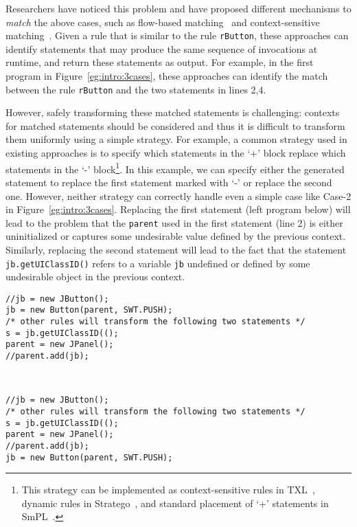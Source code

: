 \documentclass[letterpaper, USenglish]{lipics-v2016}
\newenvironment{smpage}[1]
{\begin{lrbox}{\fmbox}\begin{minipage}{#1}}
{\end{minipage}\end{lrbox}\usebox{\fmbox}}
\newcommand{\code}[1]{\texttt{\footnotesize #1}}
\theoremstyle{plain}
\begin{document}
Researchers have noticed this
problem and have proposed different
mechanisms to \emph{match} the above cases, such as flow-based
matching~\cite{DBLP:conf/popl/BrunelDHLM09} and context-sensitive matching~\cite{Cordy:2006:TST:1149670.1149672}.
Given a rule that is similar to the rule \code{rButton}, these approaches can identify
statements that may produce the same sequence of invocations at
runtime, and return these statements as output. For example, in the
first program in Figure~\ref{eg:intro:3cases}, these approaches can identify the match between the rule \code{rButton} and the two statements in lines 2,4.

However, safely transforming these matched statements is challenging: contexts for matched statements should be considered and thus it is difficult to transform them uniformly using a simple strategy.
For example,
  a common strategy used in existing approaches is to specify which
statements in the `+' block replace which statements in the `-'
block\footnote{This strategy can be implemented as context-sensitive rules
  in TXL~\cite{Cordy:2006:TST:1149670.1149672}, dynamic rules in Stratego~\cite{Bravenboer:2008:SLT:1385689.1385715}, and
  standard placement of `+' statements in SmPL~\cite{DBLP:conf/eurosys/PadioleauLHM08}.}.
In this example, we can specify either the generated statement to
replace the first statement marked with `-' or replace the second one.
However, neither strategy can correctly handle even a simple case like Case-2 in
Figure~\ref{eg:intro:3cases}. Replacing the first statement (left
program below) will lead to the problem that the \code{parent} used
in the first statement (line 2) is either uninitialized or captures some
undesirable value defined by the previous context.
Similarly, replacing the second statement
will lead to the fact that the statement \code{jb.getUIClassID()}
refers to a variable \code{jb} undefined or defined by some
undesirable object in the previous context.

\begin{center}
\begin{smpage}{0.4\columnwidth}
\begin{lstlisting}[style=patl,frame=none, basicstyle=\scriptsize\ttfamily]
//jb = new JButton();
jb = new Button(parent, SWT.PUSH);
/* other rules will transform the following two statements */
s = jb.getUIClassID(();
parent = new JPanel();
//parent.add(jb);
\end{lstlisting}
\end{smpage}
~~
\begin{smpage}{0.4\columnwidth}
\begin{lstlisting}[style=patl,frame=none, basicstyle=\scriptsize\ttfamily]
//jb = new JButton();
/* other rules will transform the following two statements */
s = jb.getUIClassID(();
parent = new JPanel();
//parent.add(jb);
jb = new Button(parent, SWT.PUSH);
\end{lstlisting}
\end{smpage}
\end{center}
\end{document}

